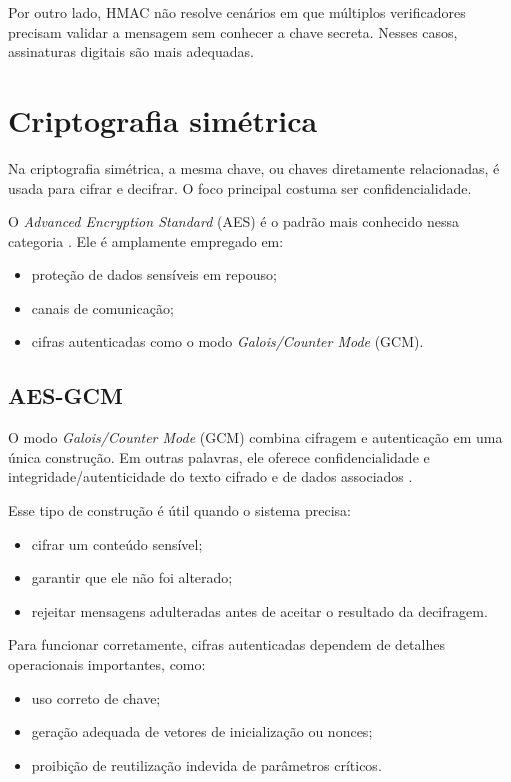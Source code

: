 Por outro lado, HMAC não resolve cenários em que múltiplos verificadores precisam validar a mensagem sem conhecer a chave secreta. Nesses casos, assinaturas digitais são mais adequadas.

\section{Criptografia simétrica}
Na criptografia simétrica, a mesma chave, ou chaves diretamente relacionadas, é usada para cifrar e decifrar. O foco principal costuma ser confidencialidade.

O \textit{Advanced Encryption Standard} (AES) é o padrão mais conhecido nessa categoria \citep{fips197}. Ele é amplamente empregado em:
\begin{itemize}[leftmargin=*]
  \item proteção de dados sensíveis em repouso;
  \item canais de comunicação;
  \item cifras autenticadas como o modo \textit{Galois/Counter Mode} (GCM).
\end{itemize}

\subsection{AES-GCM}
O modo \textit{Galois/Counter Mode} (GCM) combina cifragem e autenticação em uma única construção. Em outras palavras, ele oferece confidencialidade e integridade/autenticidade do texto cifrado e de dados associados \citep{sp800_38d}.

Esse tipo de construção é útil quando o sistema precisa:
\begin{itemize}[leftmargin=*]
  \item cifrar um conteúdo sensível;
  \item garantir que ele não foi alterado;
  \item rejeitar mensagens adulteradas antes de aceitar o resultado da decifragem.
\end{itemize}

Para funcionar corretamente, cifras autenticadas dependem de detalhes operacionais importantes, como:
\begin{itemize}[leftmargin=*]
  \item uso correto de chave;
  \item geração adequada de vetores de inicialização ou nonces;
  \item proibição de reutilização indevida de parâmetros críticos.
\end{itemize}

